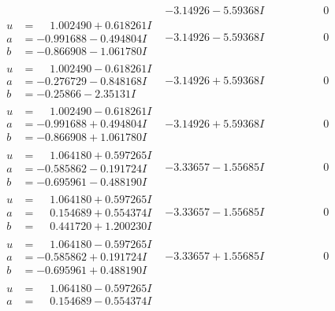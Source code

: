 \documentclass[1p]{elsarticle_modified}
\theoremstyle{definition}
\begin{document}
$$\begin{array}{c|c|c}
 & -3.14926 - 5.59368 I & \phantom{-0.000000 } 0 \\ \hline\begin{aligned}
u &= \phantom{-}1.002490 + 0.618261 I \\
a &= -0.991688 - 0.494804 I \\
b &= -0.866908 - 1.061780 I\end{aligned}
 & -3.14926 - 5.59368 I & \phantom{-0.000000 } 0 \\ \hline\begin{aligned}
u &= \phantom{-}1.002490 - 0.618261 I \\
a &= -0.276729 - 0.848168 I \\
b &= -0.25866 - 2.35131 I\end{aligned}
 & -3.14926 + 5.59368 I & \phantom{-0.000000 } 0 \\ \hline\begin{aligned}
u &= \phantom{-}1.002490 - 0.618261 I \\
a &= -0.991688 + 0.494804 I \\
b &= -0.866908 + 1.061780 I\end{aligned}
 & -3.14926 + 5.59368 I & \phantom{-0.000000 } 0 \\ \hline\begin{aligned}
u &= \phantom{-}1.064180 + 0.597265 I \\
a &= -0.585862 - 0.191724 I \\
b &= -0.695961 - 0.488190 I\end{aligned}
 & -3.33657 - 1.55685 I & \phantom{-0.000000 } 0 \\ \hline\begin{aligned}
u &= \phantom{-}1.064180 + 0.597265 I \\
a &= \phantom{-}0.154689 + 0.554374 I \\
b &= \phantom{-}0.441720 + 1.200230 I\end{aligned}
 & -3.33657 - 1.55685 I & \phantom{-0.000000 } 0 \\ \hline\begin{aligned}
u &= \phantom{-}1.064180 - 0.597265 I \\
a &= -0.585862 + 0.191724 I \\
b &= -0.695961 + 0.488190 I\end{aligned}
 & -3.33657 + 1.55685 I & \phantom{-0.000000 } 0 \\ \hline\begin{aligned}
u &= \phantom{-}1.064180 - 0.597265 I \\
a &= \phantom{-}0.154689 - 0.554374 I \\

\end{aligned}
\end{array}$$
\end{document}
